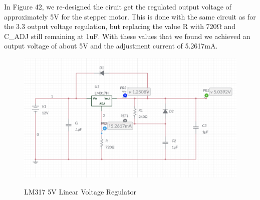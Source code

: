 In Figure 42, we re-designed the ciruit get the regulated output voltage of approximately 5V for the stepper motor. This is done with the same circuit as for the 3.3 output voltage regulation, but replacing the value R with 720Ω and C_{ADJ} still remaining at 1uF. With these values that we found we achieved an output voltage of about 5V and the adjustment current of 5.2617mA.\par
\begin{figure}[H]
    \centering
    \caption{LM317 5V Linear Voltage Regulator}
    \includegraphics[width=\textwidth]{images/LM317_5_schematic.png}
    \label{fig:5V-linear-voltage-regulator}
\end{figure}

